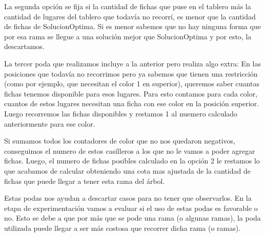 La segunda opción se fija si la cantidad de fichas que puse en el tablero más la cantidad de lugares del tablero que todavía no recorrí, es menor que la cantidad de fichas de SolucionOptima. Si es menor sabemos que no hay ninguna forma que por esa rama se llegue a una solución mejor que SolucionOptima y por esto, la descartamos.

La tercer poda que realizamos incluye a la anterior pero realiza algo extra: En las posiciones que todavía no recorrimos pero ya sabemos que tienen una restricción (como por ejemplo, que necesitan el color 1 en superior), queremos saber cuantas fichas tenemos disponible para esos lugares. Para esto contamos para cada color, cuantos de estos lugares necesitan una ficha con ese color en la posición superior. Luego recorremos las fichas disponibles y restamos 1 al nuemero calculado anteriormente para ese color.

Si sumamos todos los contadores de color que no nos quedaron negativos, conseguimos el numero de estos casilleros a los que no le vamos a poder agregar fichas. Luego, el numero de fichas posibles calculado en la opción 2 le restamos lo que acabamos de calcular obteniendo una cota mas ajustada de la cantidad de fichas que puede llegar a tener esta rama del árbol.

Estas podas nos ayudan a descartar casos para no tener que observarlos. En la etapa de experimentación vamos a evaluar si el uso de estas podas es favorable o no. Esto se debe a que por más que se pode una rama (o algunas ramas), la poda utilizada puede llegar a ser más costosa que recorrer dicha rama (o ramas).